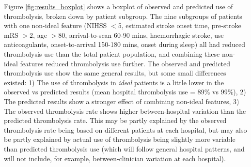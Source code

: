 Figure \ref{fig:results_boxplot} shows a boxplot of observed and predicted use of thrombolysis, broken down by patient subgroup. The nine subgroups of patients with one non-ideal feature (NIHSS $<$5, estimated stroke onset time, pre-stroke mRS $>2$, age $>80$, arrival-to-scan 60-90 mins, haemorrhagic stroke, use anticoagulants, onset-to-arrival 150-180 mins, onset during sleep) all had reduced thrombolysis use than the total patient population, and combining these non-ideal features reduced thrombolysis use further. The observed and predicted thrombolysis use show the same general results, but some small differences existed: 1) The use of thrombolysis in \emph{ideal} patients is a little lower in the observed vs predicted results (mean hospital thrombolysis use = 89\% vs 99\%), 2) The predicted results show a stronger effect of combining non-ideal features, 3) The observed thrombolysis rate shows higher between-hospital variation than the predicted thrombolysis rate. This may be partly explained by the observed thrombolysis rate being based on different patients at each hospital, but may also be partly explained by actual use of thrombolysis being slightly more variable than predicted thrombolysis use (which will follow general hospital patterns, and will not include, for example, between-clinician variation at each hospital).


